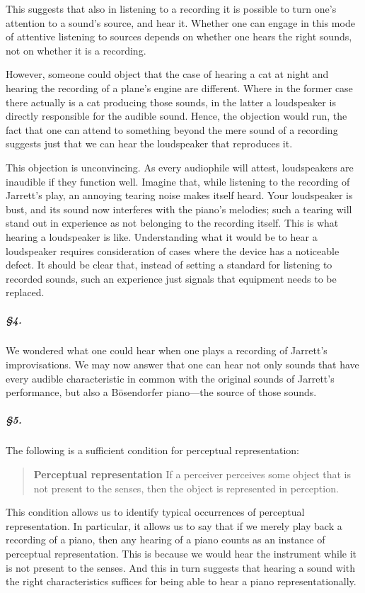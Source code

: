 \documentclass[sloppy, journal, git, anonymise]{humapap}
\begin{document}
This suggests that also in listening to a recording it is possible to
turn one's attention to a sound's source, and hear it. Whether one can
engage in this mode of attentive listening to sources depends on whether
one hears the right sounds, not on whether it is a recording.

However, someone could object that the case of hearing a cat at night
and hearing the recording of a plane's engine are different. Where in
the former case there actually is a cat producing those sounds, in the
latter a loudspeaker is directly responsible for the audible sound.
Hence, the objection would run, the fact that one can attend to
something beyond the mere sound of a recording suggests just that we can
hear the loudspeaker that reproduces it.

This objection is unconvincing. As every audiophile will attest,
loudspeakers are inaudible if they function well. Imagine that, while
listening to the recording of Jarrett's play, an annoying tearing noise
makes itself heard. Your loudspeaker is bust, and its sound now
interferes with the piano's melodies; such a tearing will stand out in
experience as not belonging to the recording itself. This is what
hearing a loudspeaker is like. Understanding what it would be to hear a
loudspeaker requires consideration of cases where the device has a
noticeable defect. It should be clear that, instead of setting a
standard for listening to recorded sounds, such an experience just
signals that equipment needs to be replaced.

\subparagraph{§4.}\label{section-3}

We wondered what one could hear when one plays a recording of Jarrett's
improvisations. We may now answer that one can hear not only sounds that
have every audible characteristic in common with the original sounds of
Jarrett's performance, but also a Bösendorfer piano---the source of
those sounds.

\subparagraph{§5.}\label{section-4}

The following is a sufficient condition for perceptual representation:

\begin{quote}
\textbf{Perceptual representation} If a perceiver perceives some object
that is not present to the senses, then the object is represented in
perception.
\end{quote}

This condition allows us to identify typical occurrences of perceptual
representation. In particular, it allows us to say that if we merely
play back a recording of a piano, then any hearing of a piano counts as
an instance of perceptual representation. This is because we would hear
the instrument while it is not present to the senses. And this in turn
suggests that hearing a sound with the right characteristics suffices
for being able to hear a piano representationally.
\end{document}
